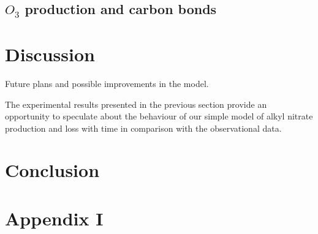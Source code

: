 \documentclass[11pt,a4paper]{article}
\begin{document}
\subsection{$O_3$ production and carbon bonds}

\section{Discussion} \label{sec:discuss}
Future plans and possible improvements in the model.

The experimental results presented in the previous section provide an opportunity to speculate about the behaviour of our simple model of alkyl nitrate production and loss with time in comparison with the observational data. 

\section{Conclusion} \label{sec:conclusion}


\section{Appendix I} \label{sec:appendix1}
\end{document}
